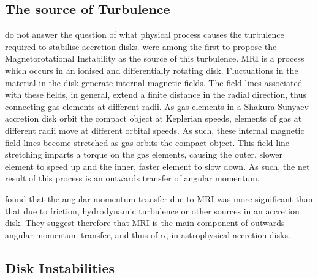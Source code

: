 \subsection{The source of Turbulence}

\par \citet{Shakura_Disk} do not answer the question of what physical process causes the turbulence required to stabilise accretion disks.  \citet{Balbus_MRI} were among the first to propose the Magnetorotational Instability \citep[MRI,][]{Velikhov_MRI,Chandrasekhar_MRI} as the source of this turbulence.  MRI is a process which occurs in an ionised and differentially rotating disk.  Fluctuations in the material in the disk generate internal magnetic fields.  The field lines associated with these fields, in general, extend a finite distance in the radial direction, thus connecting gas elements at different radii.  As gas elements in a Shakura-Sunyaev accretion disk orbit the compact object at Keplerian speeds, elements of gas at different radii move at different orbital speeds.  As such, these internal magnetic field lines become stretched as gas orbits the compact object.  This field line stretching imparts a torque on the gas elements, causing the outer, slower element to speed up and the inner, faster element to slow down.  As such, the net result of this process is an outwards transfer of angular momentum.
\par \citet{Balbus_MRI} found that the angular momentum transfer due to MRI was more significant than that due to friction, hydrodynamic turbulence or other sources in an accretion disk.  They suggest therefore that MRI is the main component of outwards angular momentum transfer, and thus of $\alpha$, in astrophysical accretion disks.

\subsection{Disk Instabilities}

\label{sec:diskinstab}

